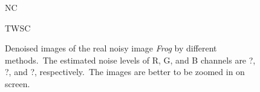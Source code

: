 \begin{figure}
{\begin{minipage}[t]{0.24\textwidth}
{\footnotesize NC}
\end{minipage}
\begin{minipage}[t]{0.24\textwidth}
\centering
{}
{\footnotesize TWSC}
\end{minipage}
}
\caption{Denoised images of the real noisy image \textsl{Frog} \cite{ncwebsite} by different methods.\ The estimated noise levels of R, G, and B channels are ?, ?, and ?, respectively.\ The images are better to be zoomed in on screen.}
    \label{fig5-9}
\end{figure}



